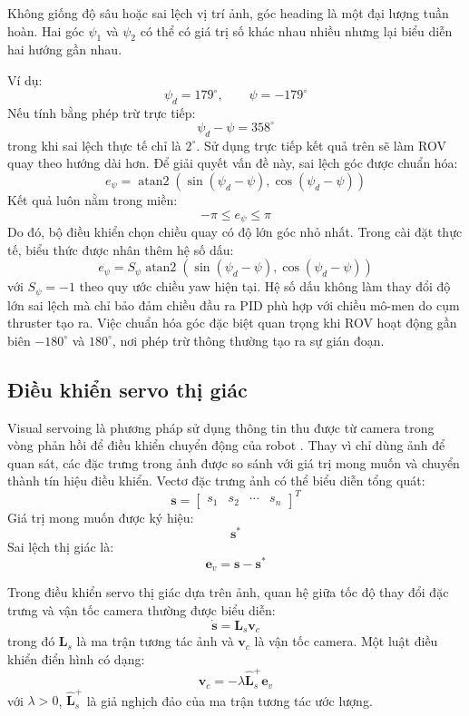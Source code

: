 \documentclass[../DoAn.tex]{subfiles}
\begin{document}
Không giống độ sâu hoặc sai lệch vị trí ảnh, góc heading là một đại lượng tuần hoàn. Hai góc $\psi_1$ và $\psi_2$ có thể có giá trị số khác nhau nhiều nhưng lại biểu diễn hai hướng gần nhau. 

Ví dụ:
\[
\psi_d = 179^{\circ}, \qquad \psi = -179^{\circ}
\]
Nếu tính bằng phép trừ trực tiếp:
\[
\psi_d - \psi = 358^{\circ}
\]
trong khi sai lệch thực tế chỉ là $2^{\circ}$. Sử dụng trực tiếp kết quả trên sẽ làm ROV quay theo hướng dài hơn. Để giải quyết vấn đề này, sai lệch góc được chuẩn hóa:
\[
e_\psi = \operatorname{atan2}\left(\sin(\psi_d-\psi), \cos(\psi_d-\psi)\right)
\]
Kết quả luôn nằm trong miền:
\[
-\pi \leq e_\psi \leq \pi
\]
Do đó, bộ điều khiển chọn chiều quay có độ lớn góc nhỏ nhất. Trong cài đặt thực tế, biểu thức được nhân thêm hệ số dấu:
\[
e_\psi = S_\psi \operatorname{atan2}\left(\sin(\psi_d-\psi), \cos(\psi_d-\psi)\right)
\]
với $S_\psi = -1$ theo quy ước chiều yaw hiện tại. Hệ số dấu không làm thay đổi độ lớn sai lệch mà chỉ bảo đảm chiều đầu ra PID phù hợp với chiều mô-men do cụm thruster tạo ra. Việc chuẩn hóa góc đặc biệt quan trọng khi ROV hoạt động gần biên $-180^{\circ}$ và $180^{\circ}$, nơi phép trừ thông thường tạo ra sự gián đoạn.


\subsection{Điều khiển servo thị giác}

Visual servoing là phương pháp sử dụng thông tin thu được từ camera trong vòng phản hồi để điều khiển chuyển động của robot \cite{chaumette_hutchinson2006}. Thay vì chỉ dùng ảnh để quan sát, các đặc trưng trong ảnh được so sánh với giá trị mong muốn và chuyển thành tín hiệu điều khiển. Vectơ đặc trưng ảnh có thể biểu diễn tổng quát:
\[
\mathbf{s} = 
\begin{bmatrix}
s_1 & s_2 & \cdots & s_n
\end{bmatrix}^{T}
\]
Giá trị mong muốn được ký hiệu:
\[
\mathbf{s}^{*}
\]
Sai lệch thị giác là:
\[
\mathbf{e}_v = \mathbf{s} - \mathbf{s}^{*}
\]

Trong điều khiển servo thị giác dựa trên ảnh, quan hệ giữa tốc độ thay đổi đặc trưng và vận tốc camera thường được biểu diễn:
\[
\dot{\mathbf{s}} = \boldsymbol{L}_{s}\mathbf{v}_c
\]
trong đó $\boldsymbol{L}_{s}$ là ma trận tương tác ảnh và $\mathbf{v}_c$ là vận tốc camera. Một luật điều khiển điển hình có dạng:
\[
\mathbf{v}_c = -\lambda \widehat{\boldsymbol{L}}_{s}^{+}\mathbf{e}_v
\]
với $\lambda > 0$, $\widehat{\boldsymbol{L}}_{s}^{+}$ là giả nghịch đảo của ma trận tương tác ước lượng.
\end{document}
